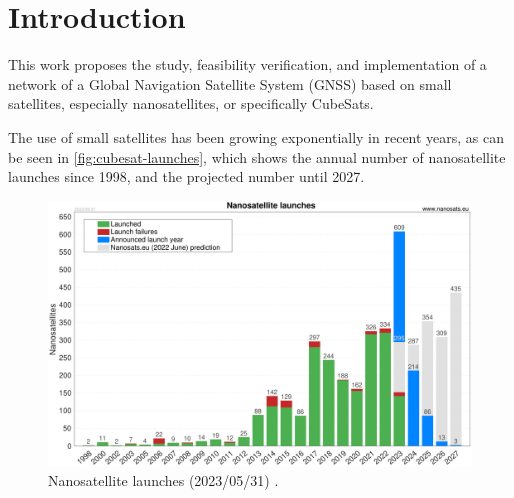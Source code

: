 %
%
%
%
%

%
%
%
%
%

\chapter{Introduction} \label{ch:introduction}

This work proposes the study, feasibility verification, and implementation of a network of a Global Navigation Satellite System (GNSS) based on small satellites, especially nanosatellites, or specifically CubeSats.

The use of small satellites has been growing exponentially in recent years, as can be seen in \autoref{fig:cubesat-launches}, which shows the annual number of nanosatellite launches since 1998, and the projected number until 2027.

\begin{figure}[!ht]
    \begin{center}
        \includegraphics[width=\columnwidth]{figures/Nanosats_years_2023-05-31}
        \caption{Nanosatellite launches (2023/05/31) \cite{nanosatseu}.}
        \label{fig:cubesat-launches}
    \end{center}
\end{figure}


